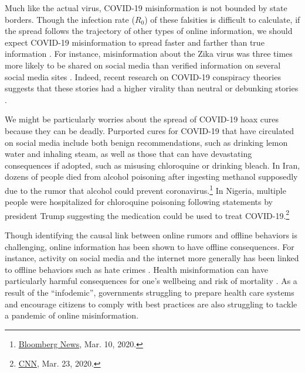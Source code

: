 \documentclass[letterpaper, 12pt, parskip=full,]{scrartcl}
\begin{document}
Much like the actual virus, COVID-19 misinformation is not bounded by state borders. Though the infection rate ($R_0$) of these falsities is difficult to calculate, if the spread follows the trajectory of other types of online information, we should expect COVID-19 misinformation to spread faster and farther than true information \citep{vosoughi2018spread}. For instance, misinformation about the Zika virus was three times more likely to be shared on social media than verified information on several social media sites \citep{sharma2017zika}. Indeed, recent research on COVID-19 conspiracy theories suggests that these stories had a higher virality than neutral or debunking stories \citep{HKS_whatsapp}. %
 

We might be particularly worries about the spread of COVID-19 hoax cures because they can be deadly. Purported cures for COVID-19 that have circulated on social media include both benign recommendations, such as drinking lemon water and inhaling steam, as well as those that can have devastating consequences if adopted, such as misusing chloroquine or drinking bleach. In Iran, dozens of people died from alcohol poisoning after ingesting methanol supposedly due to the rumor that alcohol could prevent coronavirus.\footnote{\href{https://nationalpost.com/news/world/rumours-that-alcohol-kills-covid-19-leaves-21-iranians-dead-from-poisoning}{Bloomberg News}, Mar. 10, 2020.} In Nigeria, multiple people were hospitalized for chloroquine poisoning following statements by president Trump suggesting the medication could be used to treat COVID-19.\footnote{\href{https://www.cnn.com/2020/03/23/africa/chloroquine-trump-nigeria-intl/index.html}{CNN}, Mar. 23, 2020.} 

Though identifying the causal link between online rumors and offline behaviors is challenging, online information has been shown to have offline consequences. For instance, activity on social media and the internet more generally has been linked to offline behaviors such as hate crimes \citep{muller2019fanning, chan2016internet}. Health misinformation can have particularly harmful consequences for one's wellbeing and risk of mortality \citep{swire2020public}. As a result of the ``infodemic'', governments struggling to prepare health care systems and encourage citizens to comply with best practices are also struggling to tackle a pandemic of online misinformation.
\end{document}
